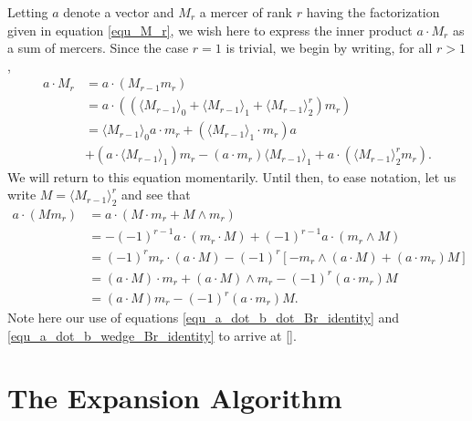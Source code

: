 \documentclass{birkjour}
\theoremstyle{definition}
\theoremstyle{remark}
\numberwithin{equation}{section}
\begin{document}
Letting $a$ denote a vector and $M_r$ a mercer of rank $r$ having the factorization
given in equation \eqref{equ_M_r},
we wish here to express the inner product $a\cdot M_r$ as a sum of mercers.
Since the case $r=1$ is trivial, we begin by writing, for all $r>1$,
\begin{align}
a\cdot M_r &= a\cdot (M_{r-1}m_r)\nonumber \\
 &= a\cdot((\langle M_{r-1}\rangle_0 + \langle M_{r-1}\rangle_1 + \langle M_{r-1}\rangle_2^r)m_r)\nonumber \\
 &= \langle M_{r-1}\rangle_0a\cdot m_r + (\langle M_{r-1}\rangle_1\cdot m_r)a\nonumber \\
 &+ (a\cdot\langle M_{r-1}\rangle_1)m_r - (a\cdot m_r)\langle M_{r-1}\rangle_1 + a\cdot(\langle M_{r-1}\rangle_2^rm_r).
\end{align}
We will return to this equation momentarily.  Until then, to ease notation, let us write $M=\langle M_{r-1}\rangle_2^r$ and see that
\begin{align}
a\cdot(Mm_r)
 &= a\cdot(M\cdot m_r + M\wedge m_r)\nonumber \\
 &= -(-1)^{r-1}a\cdot(m_r\cdot M) + (-1)^{r-1}a\cdot(m_r\wedge M)\nonumber \\
 &= (-1)^rm_r\cdot(a\cdot M) - (-1)^r\left[-m_r\wedge(a\cdot M)+(a\cdot m_r)M\right]\nonumber \\
 &= (a\cdot M)\cdot m_r + (a\cdot M)\wedge m_r - (-1)^r(a\cdot m_r)M\nonumber \\
 &= (a\cdot M)m_r - (-1)^r(a\cdot m_r)M.
\end{align}
Note here our use of equations \eqref{equ_a_dot_b_dot_Br_identity} and \eqref{equ_a_dot_b_wedge_Br_identity} to arrive at \eqref{}.

\section{The Expansion Algorithm}



\end{document}
